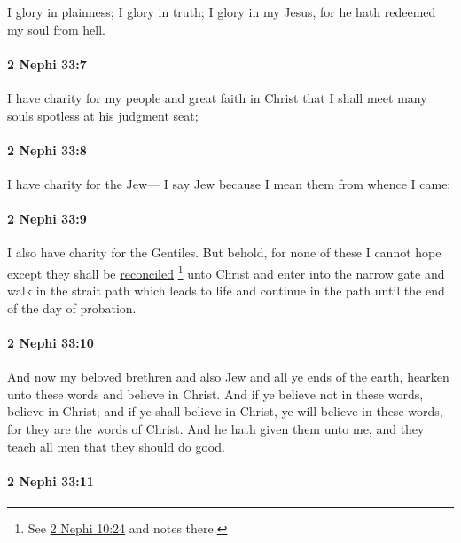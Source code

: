 			I glory in plainness;
			I glory in truth;
			I glory in my Jesus,
			for he hath redeemed my soul from hell.

		\paragraph{2 Nephi 33:7} %
			\label{2NEPHI-33-7}

			I have charity for my people and great faith in Christ
			that I shall meet many souls spotless at his judgment seat;

		\paragraph{2 Nephi 33:8} %
			\label{2NEPHI-33-8}

			I have charity for the Jew---
			I say Jew because I mean them from whence I came;

		\paragraph{2 Nephi 33:9} %
			\label{2NEPHI-33-9}

			I also have charity for the Gentiles.
			But behold, for none of these I cannot hope
			except they shall be \hyperref[RECONCILIATION]{reconciled}%
				\footnote{%
					See \hyperref[2NEPHI-10-24]{2 Nephi 10:24} and notes there.
					}
			unto Christ
			and enter into the narrow gate
			and walk in the strait path which leads to life
			and continue in the path until the end of the day of probation.

		\paragraph{2 Nephi 33:10} %
			\label{2NEPHI-33-10}

			And now my beloved brethren and also Jew and all ye ends of the earth,
			hearken unto these words and believe in Christ.
			And if ye believe not in these words,
			believe in Christ;
			and if ye shall believe in Christ,
			ye will believe in these words,
			for they are the words of Christ.
			And he hath given them unto me,
			and they teach all men that they should do good.

		\paragraph{2 Nephi 33:11} %
			\label{2NEPHI-33-11}

